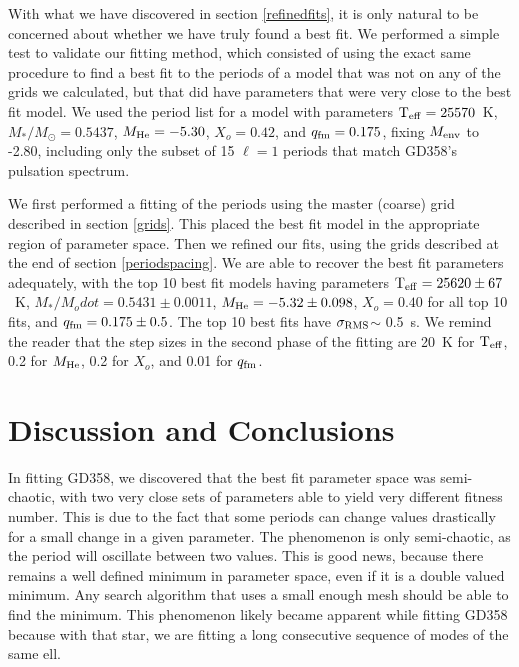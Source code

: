 \documentclass[12pt,preprint]{aastex}
\newcommand{\sigrms}{$\sigma_{\rm RMS}$}
\begin{document}
With what we have discovered in section \ref{refinedfits}, it is only natural to be concerned about whether we have truly found a best fit. We performed a simple test to validate our fitting method, which consisted of using the exact same procedure to find a best fit to the periods of a model that was not on any of the grids we calculated, but that did have parameters that were very close to the best fit model. We used the period list for a model with parameters ${\rm T_{eff}}=25570$~K, $M_*/M_\odot=0.5437$, $M_{\rm He}=-5.30$, $X_o=0.42$, and $q_{\rm fm}=0.175$, fixing $M_{\rm env}$ to -2.80, including only the subset of 15 $\ell=1$ periods that match GD358's pulsation spectrum.

We first performed a fitting of the periods using the master (coarse) grid described in section \ref{grids}. This placed the best fit model in the appropriate region of parameter space. Then we refined our fits, using the grids described at the end of section \ref{periodspacing}. We are able to recover the best fit parameters adequately, with the top 10 best fit models having parameters ${\rm T_{eff}}=25620 \pm 67$~K, $M_*/M_odot=0.5431 \pm 0.0011$, $M_{\rm He}=-5.32 \pm 0.098$, $X_o=0.40$ for all top 10 fits, and $q_{\rm fm}=0.175 \pm 0.5$. The top 10 best fits have \sigrms $\sim$ 0.5~s. We remind the reader that the step sizes in the second phase of the fitting are 20~K for ${\rm T_{eff}}$, 0.2 for $M_{\rm He}$, 0.2 for $X_o$, and 0.01 for $q_{\rm fm}$.

\section{Discussion and Conclusions}
\label{discussion}

In fitting GD358, we discovered that the best fit parameter space was semi-chaotic, with two very close sets of parameters able to yield very different fitness number. This is due to the fact that some periods can change values drastically for a small change in a given parameter. The phenomenon is only semi-chaotic, as the period will oscillate between two values. This is good news, because there remains a well defined minimum in parameter space, even if it is a double valued minimum. Any search algorithm that uses a small enough mesh should be able to find the minimum. This phenomenon likely became apparent while fitting GD358 because with that star, we are fitting a long consecutive sequence of modes of the same ell.
\end{document}
